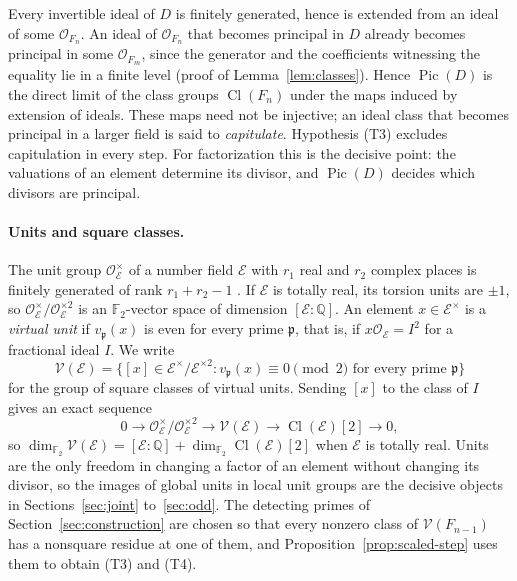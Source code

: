 \documentclass[11pt]{article}
\theoremstyle{plain}
\theoremstyle{definition}
\theoremstyle{remark}
\DeclareMathOperator{\Pic}{Pic}
\DeclareMathOperator{\Cl}{Cl}
\newcommand{\Q}{\mathbb Q}
\newcommand{\F}{\mathbb F}
\newcommand{\OO}{\mathcal O}
\begin{document}
Every invertible ideal of $D$ is finitely generated, hence is extended
from an ideal of some $\OO_{F_n}$.  An ideal of $\OO_{F_n}$ that becomes
principal in $D$ already becomes principal in some $\OO_{F_m}$, since the
generator and the coefficients witnessing the equality lie in a finite
level (proof of Lemma~\ref{lem:classes}).  Hence $\Pic(D)$ is the direct
limit of the class groups $\Cl(F_n)$ under the maps induced by extension
of ideals.  These maps need not be injective; an ideal class that becomes
principal in a larger field is said to \emph{capitulate}.  Hypothesis (T3)
excludes capitulation in every step.  For factorization this is the
decisive point: the valuations of an element determine its divisor, and
$\Pic(D)$ decides which divisors are principal.

\paragraph{Units and square classes.}  The unit group
$\OO_{\mathcal E}^\times$ of a number field $\mathcal E$ with $r_1$ real
and $r_2$ complex places is finitely generated of rank $r_1+r_2-1$
\cite[Theorem~5.1]{MilneANT}.  If $\mathcal E$ is totally real, its torsion
units are $\pm1$, so $\OO_{\mathcal E}^\times/\OO_{\mathcal E}^{\times2}$
is an $\F_2$-vector space of dimension $[\mathcal E:\Q]$.  An element
$x\in\mathcal E^\times$ is a \emph{virtual unit} if $v_{\mathfrak p}(x)$ is
even for every prime $\mathfrak p$, that is, if $x\OO_{\mathcal E}=I^2$ for
a fractional ideal $I$.  We write
\[
 \mathcal V(\mathcal E)=\{[x]\in\mathcal E^\times/\mathcal E^{\times2}:
   v_{\mathfrak p}(x)\equiv0\pmod2\text{ for every prime }\mathfrak p\}
\]
for the group of square classes of virtual units.  Sending $[x]$ to the
class of $I$ gives an exact sequence
\[
 0\longrightarrow\OO_{\mathcal E}^\times/\OO_{\mathcal E}^{\times2}
 \longrightarrow\mathcal V(\mathcal E)
 \longrightarrow\Cl(\mathcal E)[2]\longrightarrow0,
\]
so $\dim_{\F_2}\mathcal V(\mathcal E)=[\mathcal E:\Q]+\dim_{\F_2}\Cl(\mathcal
E)[2]$ when $\mathcal E$ is totally real.  Units are the only freedom in changing a factor of an
element without changing its divisor, so the images of global units in
local unit groups are the decisive objects in Sections~\ref{sec:joint}
to~\ref{sec:odd}.  The detecting primes of Section~\ref{sec:construction}
are chosen so that every nonzero class of $\mathcal V(F_{n-1})$ has a
nonsquare residue at one of them, and Proposition~\ref{prop:scaled-step}
uses them to obtain (T3) and (T4).
\end{document}
